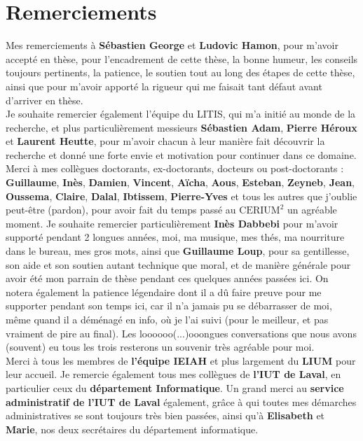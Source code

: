 \chapter*{Remerciements}


Mes remerciements à \textbf{Sébastien George} et \textbf{Ludovic Hamon}, pour m'avoir accepté en thèse, pour l'encadrement de cette thèse, la bonne humeur, les conseils toujours pertinents, la patience, le soutien tout au long des étapes de cette thèse, ainsi que pour m'avoir apporté la rigueur qui me faisait tant défaut avant d'arriver en thèse.\\


Je souhaite remercier également l'équipe du LITIS, qui m'a initié au monde de la recherche, et plus particulièrement messieurs \textbf{Sébastien Adam}, \textbf{Pierre Héroux} et \textbf{Laurent Heutte}, pour m'avoir chacun à leur manière fait découvrir la recherche et donné une forte envie et motivation pour continuer dans ce domaine.\\

Merci à mes collègues doctorants, ex-doctorants, docteurs ou post-doctorants : \textbf{Guillaume}, \textbf{Inès}, \textbf{Damien}, \textbf{Vincent}, \textbf{Aïcha}, \textbf{Aous}, \textbf{Esteban}, \textbf{Zeyneb}, \textbf{Jean}, \textbf{Oussema}, \textbf{Claire}, \textbf{Dalal}, \textbf{Ibtissem}, \textbf{Pierre-Yves} et tous les autres que j'oublie peut-être (pardon), pour avoir fait du temps passé au $\text{CERIUM}^2$ un agréable moment. Je souhaite remercier particulièrement \textbf{Inès Dabbebi} pour m'avoir supporté pendant 2 longues années, moi, ma musique, mes thés, ma nourriture dans le bureau, mes gros mots, ainsi que \textbf{Guillaume Loup}, pour sa gentillesse, son aide et son soutien autant technique que moral, et de manière générale pour avoir été mon parrain de thèse pendant ces quelques années passées ici. On notera également la patience légendaire dont il a dû faire preuve pour me supporter pendant son temps ici, car il n'a jamais pu se débarrasser de moi, même quand il a déménagé en info, où je l'ai suivi (pour le meilleur, et pas vraiment de pire au final). Les loooooo(...)ooongues conversations que nous avons (souvent) eu tous les trois resterons un souvenir très agréable pour moi.\\

Merci à tous les membres de \textbf{l'équipe IEIAH} et plus largement du \textbf{LIUM} pour leur accueil. Je remercie également tous mes collègues de \textbf{l'IUT de Laval}, en particulier ceux du \textbf{département Informatique}. Un grand merci au \textbf{service administratif de l'IUT de Laval} également, grâce à qui toutes mes démarches administratives se sont toujours très bien passées, ainsi qu'à \textbf{Elisabeth} et \textbf{Marie}, nos deux secrétaires du département informatique.\\


